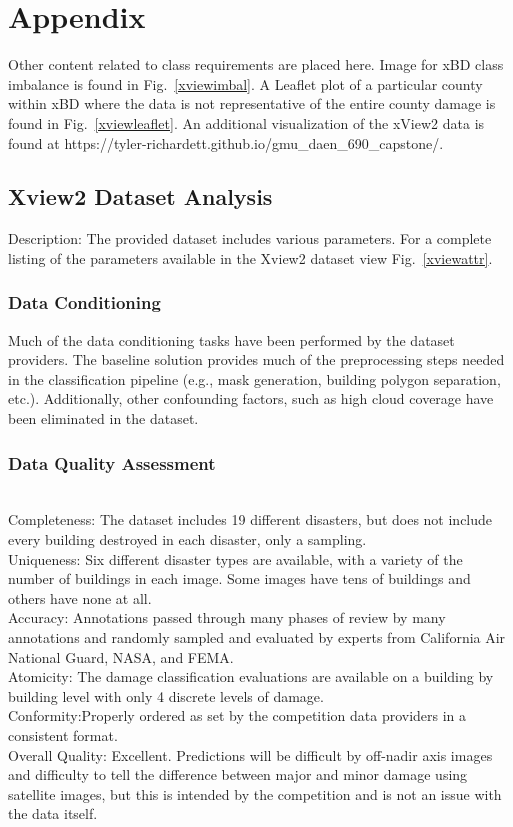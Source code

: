 \documentclass[conference]{IEEEtran}
\begin{document}
\vspace{12pt}
\newpage
\pagebreak
\newpage
\section*{Appendix}
Other content related to class requirements are placed here. Image for xBD class imbalance is found in Fig.~\ref{xviewimbal}. A Leaflet plot of a particular county within xBD where the data is not representative of the entire county damage is found in Fig.~\ref{xviewleaflet}. An additional visualization of the xView2 data is found at https://tyler-richardett.github.io/gmu_daen_690_capstone/. 

\subsection{Xview2 Dataset Analysis}
\textbullet Description:
The provided dataset includes various parameters. For a complete listing of the parameters available in the Xview2 dataset view Fig.~\ref{xviewattr}. 

\subsubsection{Data Conditioning}
Much of the data conditioning tasks have been performed by the dataset providers. The baseline solution provides much of the preprocessing steps needed in the classification pipeline (e.g., mask generation, building polygon separation, etc.). Additionally, other confounding factors, such as high cloud coverage have been eliminated in the dataset.

\subsubsection{Data Quality Assessment} \\
\textbullet Completeness: The dataset includes 19 different disasters, but does not include every building destroyed in each disaster, only a sampling.\\
\textbullet Uniqueness: Six different disaster types are available, with a variety of the number of buildings in each image. Some images have tens of buildings and others have none at all.\\
\textbullet Accuracy: Annotations passed through many phases of review by many annotations and randomly sampled and evaluated by experts from California Air National Guard, NASA, and FEMA. \\
\textbullet Atomicity: The damage classification evaluations are available on a building by building level with only 4 discrete levels of damage.\\
\textbullet Conformity:Properly ordered as set by the competition data providers in a consistent format.\\
\textbullet Overall Quality: Excellent. Predictions will be difficult by off-nadir axis images and difficulty to tell the difference between major and minor damage using satellite images, but this is intended by the competition and is not an issue with the data itself.
\end{document}
